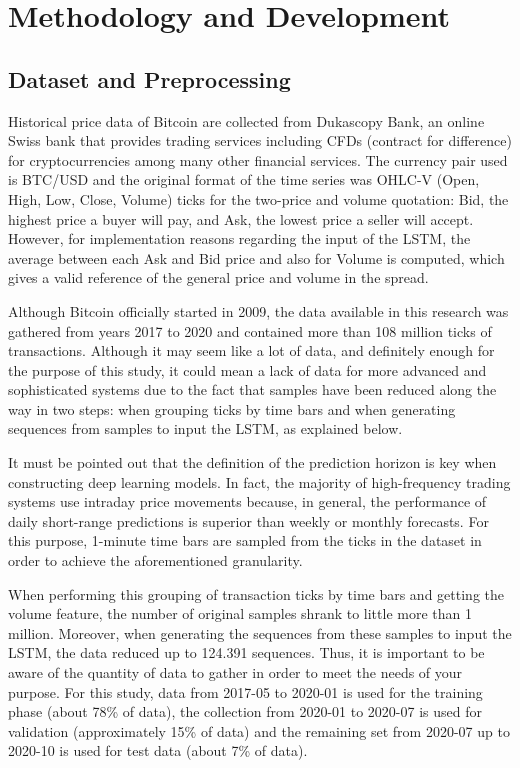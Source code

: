 \documentclass[10pt,twocolumn,letterpaper]{article}
\begin{document}
\section{Methodology and Development}

\subsection{Dataset and Preprocessing}

Historical price data of Bitcoin are collected from Dukascopy Bank, an online Swiss bank that provides trading services including CFDs (contract for difference) for cryptocurrencies among many other financial services. The currency pair used is BTC/USD and the original format of the time series was OHLC-V (Open, High, Low, Close, Volume) ticks for the two-price and volume quotation: Bid, the highest price a buyer will pay, and Ask, the lowest price a seller will accept. However, for implementation reasons regarding the input of the LSTM, the average between each Ask and Bid price and also for Volume is computed, which gives a valid reference of the general price and volume in the spread.

Although Bitcoin officially started in 2009, the data available in this research was gathered from years 2017 to 2020 and contained more than 108 million ticks of transactions. Although it may seem like a lot of data, and definitely enough for the purpose of this study, it could mean a lack of data for more advanced and sophisticated systems due to the fact that samples have been reduced along the way in two steps: when grouping ticks by time bars and when generating sequences from samples to input the LSTM, as explained below.

It must be pointed out that the definition of the prediction horizon is key when constructing deep learning models. In fact, the majority of high-frequency trading systems use intraday price movements because, in general, the performance of daily short-range predictions is superior than weekly or monthly forecasts. For this purpose, 1-minute time bars are sampled from the ticks in the dataset in order to achieve the aforementioned granularity.

When performing this grouping of transaction ticks by time bars and getting the volume feature, the number of original samples shrank to little more than 1 million. Moreover, when generating the sequences from these samples to input the LSTM, the data reduced up to 124.391 sequences. Thus, it is important to be aware of the quantity of data to gather in order to meet the needs of your purpose. For this study, data from 2017-05 to 2020-01 is used for the training phase (about 78\% of data), the collection from 2020-01 to 2020-07 is used for validation (approximately 15\% of data) and the remaining set from 2020-07 up to 2020-10 is used for test data (about 7\% of data).
\end{document}
